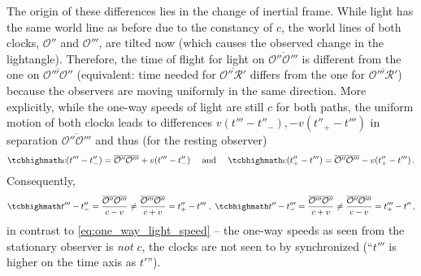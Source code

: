 The origin of these differences lies in the change of inertial frame. While light has the same world line as before due to the constancy of $c$, the world lines of both clocks, $\mathcal{O}''$ and $\mathcal{O}'''$, are tilted now (which causes the observed change in the lightangle). Therefore, the time of flight for light on $\overline{\mathcal{O}'' \mathcal{O}'''}$ is different from the one on $\overline{\mathcal{O}''' \mathcal{O}''}$ (equivalent: time needed for $\overline{\mathcal{O}'' \mathcal{R}'}$ differs from the one for $\overline{\mathcal{O}''' \mathcal{R}'}$) because the observers are moving uniformly in the same direction. More explicitly, while the one-way speeds of light are still $c$ for both paths, the uniform motion of both clocks leads to differences $v (t''' - t''_-), -v (t''_+ - t''')$ in separation $\overline{\mathcal{O}'' \mathcal{O}'''}$ and thus (for the resting observer)
\begin{equation}\label{eq:one_way_light_speed_v2}
	\eqbox{
	c (t''' - t''_-) = \overline{\mathcal{O}'' \mathcal{O}'''} + v (t''' - t''_-)
	}
	\quad \text{ and } \quad
	\eqbox{
	c (t''_+ - t''') = \overline{\mathcal{O}'' \mathcal{O}'''} - v (t''_+ - t''')
	} \, .
\end{equation}
Consequently,
\begin{align}
	\eqbox{
	t''' - t''_- = \frac{\overline{\mathcal{O}'' \mathcal{O}'''}}{c - v} \neq \frac{\overline{\mathcal{O}''' \mathcal{O}''}}{c + v} = t''_+ - t'''
	}
	\; , \;
	\eqbox{
	t'' - t'''_- = \frac{\overline{\mathcal{O}''' \mathcal{O}''}}{c + v} \neq \frac{\overline{\mathcal{O}'' \mathcal{O}'''}}{c - v} = t'''_+ - t''
	} \, ,
\end{align}
in contrast to  \eqref{eq:one_way_light_speed} -- the one-way speeds as seen from the stationary observer is \emph{not} $c$, the clocks are not seen to by synchronized (\enquote{$t'''$ is higher on the time axis as $t'$}).



